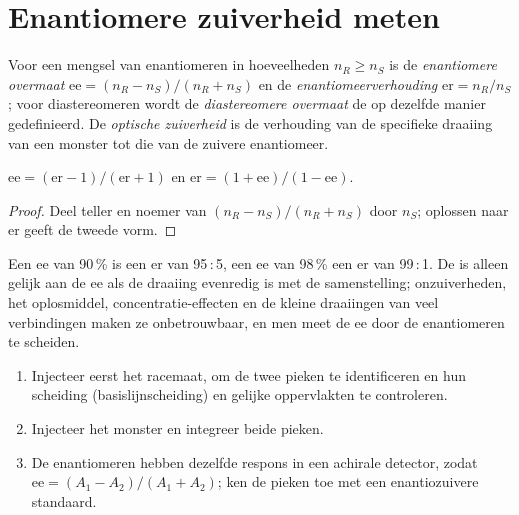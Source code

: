 \section{Enantiomere zuiverheid meten}

\begin{definition}\label{def:b3:asymmetric-synthesis:ee}
Voor een mengsel van enantiomeren in hoeveelheden $n_R \ge n_S$ is de
\emph{enantiomere overmaat} $\mathrm{ee} = (n_R - n_S)/(n_R + n_S)$ en de
\emph{enantiomeerverhouding} $\mathrm{er} = n_R/n_S$; voor diastereomeren wordt de
\emph{diastereomere overmaat} de op dezelfde
manier gedefinieerd. De \emph{optische zuiverheid}
is de verhouding van de specifieke draaiing van een monster tot die van
de zuivere enantiomeer.
\end{definition}

\begin{proposition}[ee en er]\label{prop:b3:asymmetric-synthesis:ee-er}
$\mathrm{ee} = (\mathrm{er} - 1)/(\mathrm{er} + 1)$ en $\mathrm{er} = (1 + \mathrm{ee})/(1 - \mathrm{ee})$.
\end{proposition}

\begin{proof}
Deel teller en noemer van $(n_R - n_S)/(n_R + n_S)$ door $n_S$; oplossen naar er geeft de
tweede vorm.
\end{proof}

Een ee van 90\,\% is een er van 95\,:\,5, een ee van 98\,\% een er van
99\,:\,1. De  is alleen gelijk aan de ee als de
draaiing evenredig is met de samenstelling; onzuiverheden, het
oplosmiddel, concentratie-effecten en de kleine draaiingen van veel
verbindingen maken ze onbetrouwbaar, en men meet de ee door de
enantiomeren te scheiden.

\begin{method}\label{met:b3:asymmetric-synthesis:ee-chromatogram}
\begin{enumerate}
  \item Injecteer eerst het racemaat, om de twee pieken te identificeren
        en hun scheiding (basislijnscheiding) en gelijke oppervlakten te
        controleren.
  \item Injecteer het monster en integreer beide pieken.
  \item De enantiomeren hebben dezelfde respons in een achirale detector,
        zodat
        $\mathrm{ee} = (A_1 - A_2)/(A_1 + A_2)$; ken de pieken toe met een enantiozuivere standaard.
\end{enumerate}
\end{method}

